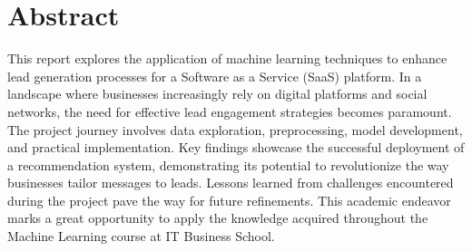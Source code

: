 \section*{Abstract}
This report explores the application of machine learning techniques to enhance lead generation processes for a Software as a Service (SaaS) platform. In a landscape where businesses increasingly rely on digital platforms and social networks, the need for effective lead engagement strategies becomes paramount. The project journey involves data exploration, preprocessing, model development, and practical implementation. Key findings showcase the successful deployment of a recommendation system, demonstrating its potential to revolutionize the way businesses tailor messages to leads. Lessons learned from challenges encountered during the project pave the way for future refinements. This academic endeavor marks a great opportunity to apply the knowledge acquired throughout the Machine Learning course at IT Business School.

\newpage
